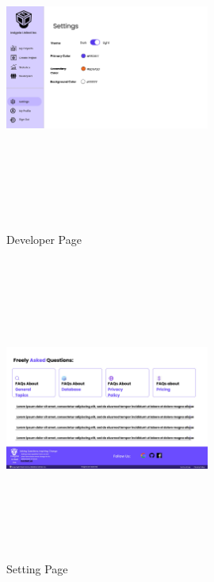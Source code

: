 \begin{figure}[H]
    \centering 
\includegraphics[height=10cm, width=0.6\textwidth]{./images/prototype/0006}
\caption{Developer Page}
\label{fig:prototype1}


\includegraphics[height=10cm, width=0.6\textwidth]{./images/prototype/0016}
\centering 
\caption{Setting Page}
\label{fig:prototype1}

\end{figure}

